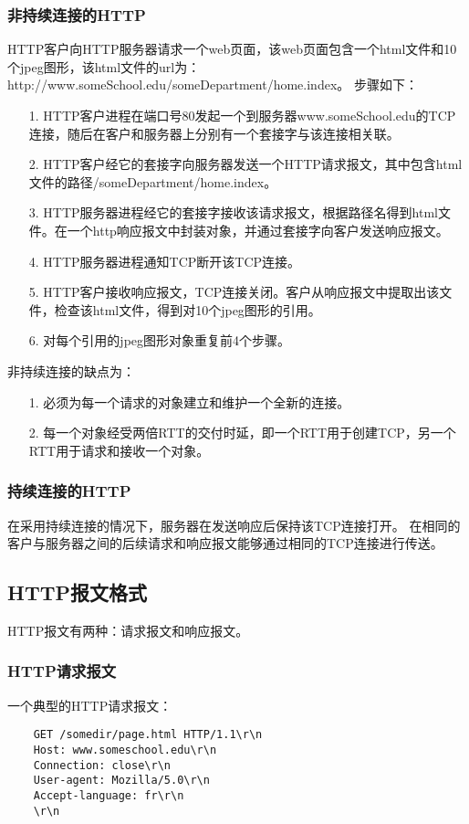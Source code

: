 \documentclass[a4paper,left=2.5cm,right=2.5cm,11pt]{article}
\begin{document}
\subsubsection{非持续连接的HTTP}
	HTTP客户向HTTP服务器请求一个web页面，该web页面包含一个html文件和10个jpeg图形，该html文件的url为：http://www.someSchool.edu/someDepartment/home.index。
	步骤如下：
	\begin{itemize}
		\item[1.] HTTP客户进程在端口号80发起一个到服务器www.someSchool.edu的TCP连接，随后在客户和服务器上分别有一个套接字与该连接相关联。
		\item[2.] HTTP客户经它的套接字向服务器发送一个HTTP请求报文，其中包含html文件的路径/someDepartment/home.index。
		\item[3.] HTTP服务器进程经它的套接字接收该请求报文，根据路径名得到html文件。在一个http响应报文中封装对象，并通过套接字向客户发送响应报文。
		\item[4.] HTTP服务器进程通知TCP断开该TCP连接。
		\item[5.] HTTP客户接收响应报文，TCP连接关闭。客户从响应报文中提取出该文件，检查该html文件，得到对10个jpeg图形的引用。
		\item[6.] 对每个引用的jpeg图形对象重复前4个步骤。
	\end{itemize}

	非持续连接的缺点为：
	\begin{itemize}
		\item[1.] 必须为每一个请求的对象建立和维护一个全新的连接。
		\item[2.] 每一个对象经受两倍RTT的交付时延，即一个RTT用于创建TCP，另一个RTT用于请求和接收一个对象。
	\end{itemize}

\subsubsection{持续连接的HTTP}
	在采用持续连接的情况下，服务器在发送响应后保持该TCP连接打开。
	在相同的客户与服务器之间的后续请求和响应报文能够通过相同的TCP连接进行传送。

\subsection{HTTP报文格式}
	HTTP报文有两种：请求报文和响应报文。

\subsubsection{HTTP请求报文}
	一个典型的HTTP请求报文：
	\begin{lstlisting}
	GET /somedir/page.html HTTP/1.1\r\n
	Host: www.someschool.edu\r\n
	Connection: close\r\n
	User-agent: Mozilla/5.0\r\n
	Accept-language: fr\r\n
	\r\n
	\end{lstlisting}
\end{document}
